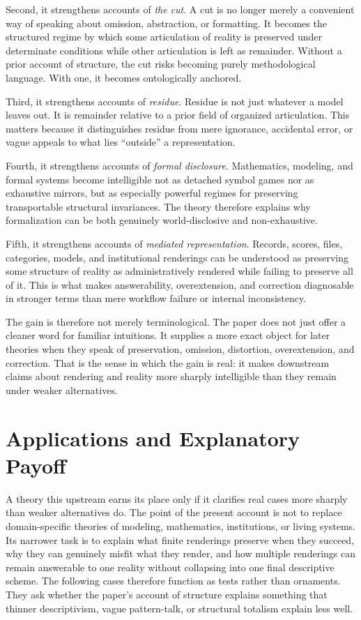 \documentclass[11pt]{article}
\renewcommand{\emph}[1]{\textit{#1}}
\begin{document}
Second, it strengthens accounts of \emph{the cut}. A cut is no longer merely a convenient way of speaking about omission, abstraction, or formatting. It becomes the structured regime by which some articulation of reality is preserved under determinate conditions while other articulation is left as remainder. Without a prior account of structure, the cut risks becoming purely methodological language. With one, it becomes ontologically anchored.

Third, it strengthens accounts of \emph{residue}. Residue is not just whatever a model leaves out. It is remainder relative to a prior field of organized articulation. This matters because it distinguishes residue from mere ignorance, accidental error, or vague appeals to what lies ``outside'' a representation.

Fourth, it strengthens accounts of \emph{formal disclosure}. Mathematics, modeling, and formal systems become intelligible not as detached symbol games nor as exhaustive mirrors, but as especially powerful regimes for preserving transportable structural invariances. The theory therefore explains why formalization can be both genuinely world-disclosive and non-exhaustive. \cite{Cassirer1953SubstanceFunction,Shapiro2000ThinkingAboutMathematics}

Fifth, it strengthens accounts of \emph{mediated representation}. Records, scores, files, categories, models, and institutional renderings can be understood as preserving some structure of reality as administratively rendered while failing to preserve all of it. This is what makes answerability, overextension, and correction diagnosable in stronger terms than mere workflow failure or internal inconsistency. \cite{BowkerStar1999SortingThingsOut}

The gain is therefore not merely terminological. The paper does not just offer a cleaner word for familiar intuitions. It supplies a more exact object for later theories when they speak of preservation, omission, distortion, overextension, and correction. That is the sense in which the gain is real: it makes downstream claims about rendering and reality more sharply intelligible than they remain under weaker alternatives.

\section{Applications and Explanatory Payoff}

A theory this upstream earns its place only if it clarifies real cases more sharply than weaker alternatives do. The point of the present account is not to replace domain-specific theories of modeling, mathematics, institutions, or living systems. Its narrower task is to explain what finite renderings preserve when they succeed, why they can genuinely misfit what they render, and how multiple renderings can remain answerable to one reality without collapsing into one final descriptive scheme. The following cases therefore function as tests rather than ornaments. They ask whether the paper's account of structure explains something that thinner descriptivism, vague pattern-talk, or structural totalism explain less well.
\end{document}
